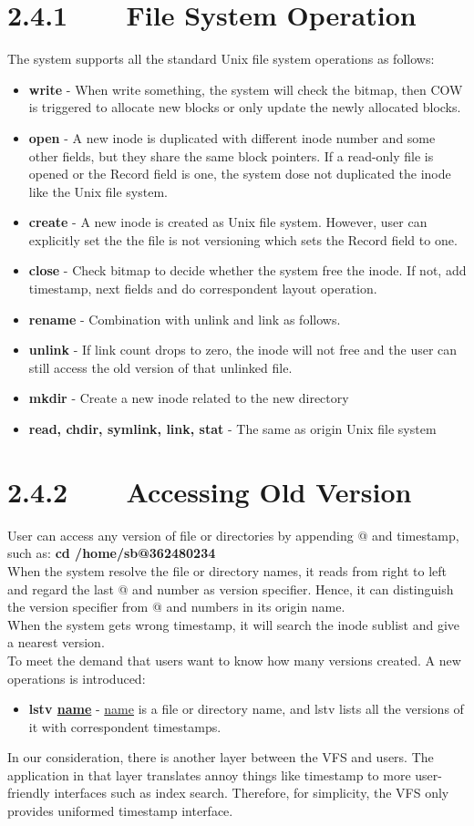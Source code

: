 \section*{2.4.1~~~~File System Operation}
The system supports all the standard Unix file system operations as follows:
\begin{itemize}
\item \textbf{write} - When write something, the system will check the bitmap, then COW is triggered to allocate new blocks or only update the newly allocated blocks.
\item \textbf{open} - A new inode is duplicated with different inode number and some other fields, but they share the same block pointers. If a read-only file is opened or the Record field is one, the system dose not duplicated the inode like the Unix file system.
\item \textbf{create} - A new inode is created as Unix file system. However, user can explicitly set the the file is not versioning which sets the Record field to one.
\item \textbf{close} - Check bitmap to decide whether the system free the inode. If not, add timestamp, next fields and do correspondent layout operation.
\item \textbf{rename} - Combination with unlink and link as follows.
\item \textbf{unlink} - If link count drops to zero, the inode will not free and the user can still access the old version of that unlinked file.
\item \textbf{mkdir} - Create a new inode related to the new directory
\item \textbf{read, chdir, symlink, link, stat} - The same as origin Unix file system
\end{itemize}
\section*{2.4.2~~~~Accessing Old Version}
User can access any version of file or directories by appending @ and timestamp, such as:  \textbf{cd /home/sb@362480234}\\[1em]When the system resolve the file or directory names, it reads from right to left and regard the last @ and number as version specifier. Hence, it can distinguish the version specifier from @ and numbers in its origin name.\\[1em]
When the system gets wrong timestamp, it will search the inode sublist and give a nearest version.\\[1em]
To meet the demand that users want to know how many versions created. A new operations is  introduced:
\begin{itemize}
\item \textbf{lstv \underline{name}} - \underline{name} is a file or directory name, and lstv lists all the versions of it with correspondent timestamps.
\end{itemize}
In our consideration, there is another layer between the VFS and users. The application in that layer translates annoy things like timestamp to more user-friendly interfaces such as index search. Therefore, for simplicity, the VFS only provides uniformed timestamp interface.

